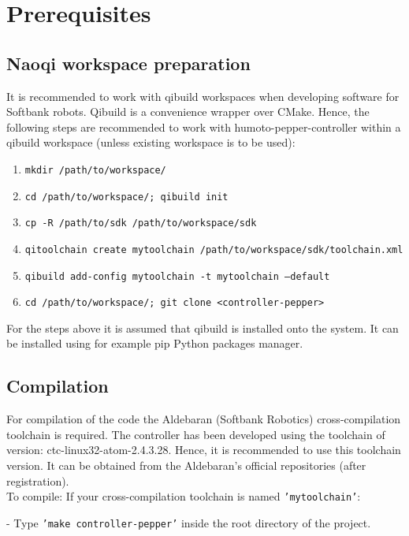 \section{Prerequisites}

\subsection{Naoqi workspace preparation}
\noindent It is recommended to work with qibuild workspaces when developing software for Softbank robots. Qibuild is a
convenience wrapper over CMake. Hence, the following steps are recommended
to work with humoto-pepper-controller within a qibuild workspace (unless existing workspace is to be used):

\begin{enumerate}
\item \texttt{mkdir /path/to/workspace/}
\item \texttt{cd /path/to/workspace/; qibuild init}
\item \texttt{cp -R /path/to/sdk /path/to/workspace/sdk}
\item \texttt{qitoolchain create mytoolchain /path/to/workspace/sdk/toolchain.xml}
\item \texttt{qibuild add-config mytoolchain -t mytoolchain --default}
\item \texttt{cd /path/to/workspace/; git clone <controller-pepper>}
\end{enumerate}

\noindent For the steps above it is assumed that qibuild is installed onto the system. It can be installed using for example pip
Python packages manager.

\subsection{Compilation}
\noindent For compilation of the code the Aldebaran (Softbank Robotics) cross-compilation toolchain is required. The
controller has been developed using the toolchain of version: ctc-linux32-atom-2.4.3.28. Hence, it is recommended to use
this toolchain version. It can be obtained from the Aldebaran's official repositories (after registration).\\

\noindent To compile:
\noindent If your cross-compilation toolchain is named \texttt{'mytoolchain'}:

- Type \texttt{'make controller-pepper'} inside the root directory of the project.\\

